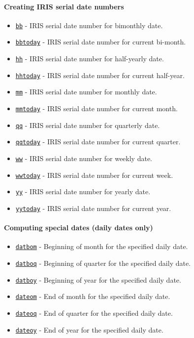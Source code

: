 

	\paragraph{Creating IRIS serial date numbers}
 
 \begin{itemize}
 \item
   \href{dates/bb}{\texttt{bb}} - IRIS serial date number for bimonthly
   date.
 \item
   \href{dates/bbtoday}{\texttt{bbtoday}} - IRIS serial date number for
   current bi-month.
 \item
   \href{dates/hh}{\texttt{hh}} - IRIS serial date number for half-yearly
   date.
 \item
   \href{dates/hhtoday}{\texttt{hhtoday}} - IRIS serial date number for
   current half-year.
 \item
   \href{dates/mm}{\texttt{mm}} - IRIS serial date number for monthly
   date.
 \item
   \href{dates/mmtoday}{\texttt{mmtoday}} - IRIS serial date number for
   current month.
 \item
   \href{dates/qq}{\texttt{qq}} - IRIS serial date number for quarterly
   date.
 \item
   \href{dates/qqtoday}{\texttt{qqtoday}} - IRIS serial date number for
   current quarter.
 \item
   \href{dates/ww}{\texttt{ww}} - IRIS serial date number for weekly
   date.
 \item
   \href{dates/wwtoday}{\texttt{wwtoday}} - IRIS serial date number for
   current week.
 \item
   \href{dates/yy}{\texttt{yy}} - IRIS serial date number for yearly
   date.
 \item
   \href{dates/yytoday}{\texttt{yytoday}} - IRIS serial date number for
   current year.
 \end{itemize}
 
 \paragraph{Computing special dates (daily dates only)}
 
 \begin{itemize}
 \item
   \href{dates/datbom}{\texttt{datbom}} - Beginning of month for the
   specified daily date.
 \item
   \href{dates/datboq}{\texttt{datboq}} - Beginning of quarter for the
   specified daily date.
 \item
   \href{dates/datboy}{\texttt{datboy}} - Beginning of year for the
   specified daily date.
 \item
   \href{dates/dateom}{\texttt{dateom}} - End of month for the specified
   daily date.
 \item
   \href{dates/dateoq}{\texttt{dateoq}} - End of quarter for the
   specified daily date.
 \item
   \href{dates/dateoy}{\texttt{dateoy}} - End of year for the specified
   daily date.
 \end{itemize}
 
